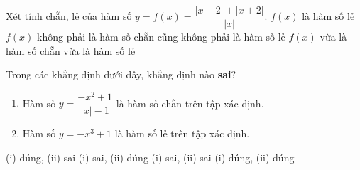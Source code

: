 \begin{ex}%
	Xét tính chẵn, lẻ của hàm số  $y = f(x)= \dfrac{\left| x - 2 \right| + \left| x + 2 \right|}{\left| x \right|}$.
	{$f(x)$ là hàm số lẻ}
	{$f(x)$ không phải là hàm số chẵn cũng không phải là hàm số lẻ}
	{$f(x)$ vừa là hàm số chẵn vừa là hàm số lẻ}
\end{ex}

\begin{ex}%
	Trong các khẳng định dưới đây, khẳng định nào {\bf sai}?
	\begin{enumerate}[\ \ i)]
		\item Hàm số $y=\dfrac{-x^2+1}{|x|-1}$ là hàm số chẵn trên tập xác định.
		\item Hàm số $y=-x^3+1$ là hàm số lẻ trên tập xác định.
	\end{enumerate}
	\choice
	{\True (i) đúng, (ii) sai}
	{(i) sai, (ii) đúng}
	{(i) sai, (ii) sai}
	{(i) đúng, (ii) đúng}
\end{ex}

